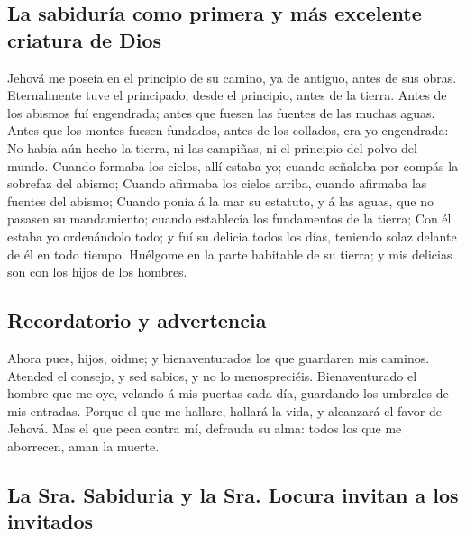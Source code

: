 \hypertarget{la-sabiduruxeda-como-primera-y-muxe1s-excelente-criatura-de-dios}{%
\subsection{La sabiduría como primera y más excelente criatura de
Dios}\label{la-sabiduruxeda-como-primera-y-muxe1s-excelente-criatura-de-dios}}

 Jehová me poseía en el principio de su camino, ya de
antiguo, antes de sus obras.  Eternalmente tuve el
principado, desde el principio, antes de la tierra.  Antes
de los abismos fuí engendrada; antes que fuesen las fuentes de las
muchas aguas.  Antes que los montes fuesen fundados, antes
de los collados, era yo engendrada:  No había aún hecho la
tierra, ni las campiñas, ni el principio del polvo del mundo.
 Cuando formaba los cielos, allí estaba yo; cuando señalaba
por compás la sobrefaz del abismo;  Cuando afirmaba los
cielos arriba, cuando afirmaba las fuentes del abismo; 
Cuando ponía á la mar su estatuto, y á las aguas, que no pasasen su
mandamiento; cuando establecía los fundamentos de la tierra;
 Con él estaba yo ordenándolo todo; y fuí su delicia todos
los días, teniendo solaz delante de él en todo tiempo. 
Huélgome en la parte habitable de su tierra; y mis delicias son con los
hijos de los hombres.

\hypertarget{recordatorio-y-advertencia}{%
\subsection{Recordatorio y
advertencia}\label{recordatorio-y-advertencia}}

 Ahora pues, hijos, oidme; y bienaventurados los que
guardaren mis caminos.  Atended el consejo, y sed sabios, y
no lo menospreciéis.  Bienaventurado el hombre que me oye,
velando á mis puertas cada día, guardando los umbrales de mis entradas.
 Porque el que me hallare, hallará la vida, y alcanzará el
favor de Jehová.  Mas el que peca contra mí, defrauda su
alma: todos los que me aborrecen, aman la muerte.

\hypertarget{la-sra.-sabiduria-y-la-sra.-locura-invitan-a-los-invitados}{%
\subsection{La Sra. Sabiduria y la Sra. Locura invitan a los
invitados}\label{la-sra.-sabiduria-y-la-sra.-locura-invitan-a-los-invitados}}

